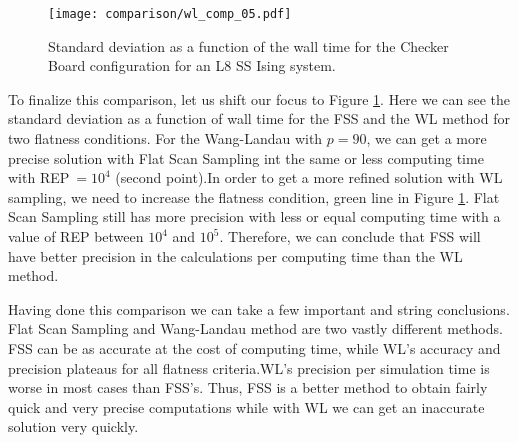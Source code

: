 \begin{figure}[h]
	\centering
	\texttt{[image: comparison/wl\_comp\_05.pdf]}
	\caption{Standard deviation as a function of the wall time for the Checker Board configuration for an L8 SS Ising system.}
	\label{time_std}
\end{figure}

	To finalize this comparison, let us shift our focus to Figure \ref{time_std}. Here we can see the standard deviation as a function of wall time for the FSS and the WL method for two flatness conditions. For the Wang-Landau with $p=90$, we can get a more precise solution with Flat Scan Sampling int the same or less computing time with REP$\ =10^4$ (second point).In order to get a more refined solution with WL sampling, we need to increase the flatness condition, green line in Figure \ref{time_std}. Flat Scan Sampling still has more precision with less or equal computing time with a value of REP between $10^4$ and $10^5$. Therefore,  we can conclude that FSS will have better precision in the calculations per computing time than the WL method.

	Having done this comparison we can take a few important and string conclusions. Flat Scan Sampling and Wang-Landau method are two vastly different methods. FSS can be as accurate at the cost of computing time, while WL's accuracy and precision plateaus for all flatness criteria.WL's precision per simulation time is worse in most cases than FSS's. Thus, FSS is a better method to obtain fairly quick and very precise computations while with WL we can get an inaccurate solution very quickly.









